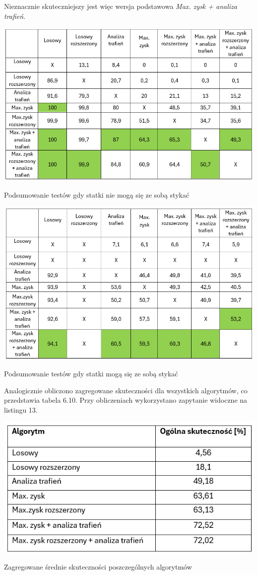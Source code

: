 Nieznacznie skuteczniejszy jest więc wersja podstawowa \emph{Max. zysk + analiza trafień}.
\begin{table}[!h]
    \centering
    \includegraphics[width=1\linewidth]{img/summary-ships-cant-touch.PNG}
    \caption{Podsumowanie testów gdy statki nie mogą się ze sobą stykać}
\end{table}

\begin{table}[!h]
    \centering
    \includegraphics[width=1\linewidth]{img/summary-ships-can-touch.PNG}
    \caption{Podsumowanie testów gdy statki mogą się ze sobą stykać}
\end{table}

Analogicznie obliczono zagregowane skuteczności dla wszystkich algorytmów, co przedstawia tabela 6.10. Przy obliczeniach wykorzystano zapytanie widoczne na listingu 13.

\begin{table}[!h]
    \centering
    \includegraphics[width=0.7\linewidth]{img/aggregate.PNG}
    \caption{Zagregowane średnie skuteczności poszczególnych algorytmów}
\end{table}

